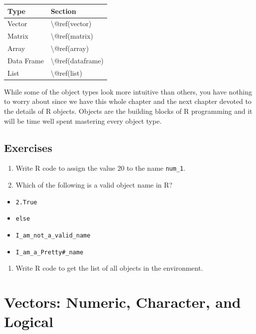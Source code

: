 \documentclass[
]{book}
\providecommand{\tightlist}{%
  \setlength{\itemsep}{0pt}\setlength{\parskip}{0pt}}
\begin{document}
\begin{tabular}{l|l}
\hline
Type & Section\\
\hline
Vector & \textbackslash{}@ref(vector)\\
\hline
Matrix & \textbackslash{}@ref(matrix)\\
\hline
Array & \textbackslash{}@ref(array)\\
\hline
Data Frame & \textbackslash{}@ref(dataframe)\\
\hline
List & \textbackslash{}@ref(list)\\
\hline
\end{tabular}

While some of the object types look more intuitive than others, you have nothing to worry about since we have this whole chapter and the next chapter devoted to the details of R objects. Objects are the building blocks of R programming and it will be time well spent mastering every object type.

\hypertarget{exercises-2}{%
\subsection{Exercises}\label{exercises-2}}

\begin{enumerate}
\def\labelenumi{\arabic{enumi}.}
\item
  Write R code to assign the value 20 to the name \texttt{num\_1}.
\item
  Which of the following is a valid object name in R?
\end{enumerate}

\begin{itemize}
\tightlist
\item
  \texttt{2.True}
\item
  \texttt{else}
\item
  \texttt{I\_am\_not\_a\_valid\_name}
\item
  \texttt{I\_am\_a\_Pretty\#\_name}
\end{itemize}

\begin{enumerate}
\def\labelenumi{\arabic{enumi}.}
\setcounter{enumi}{2}
\tightlist
\item
  Write R code to get the list of all objects in the environment.
\end{enumerate}

\hypertarget{vector}{%
\section{Vectors: Numeric, Character, and Logical}\label{vector}}
\end{document}

